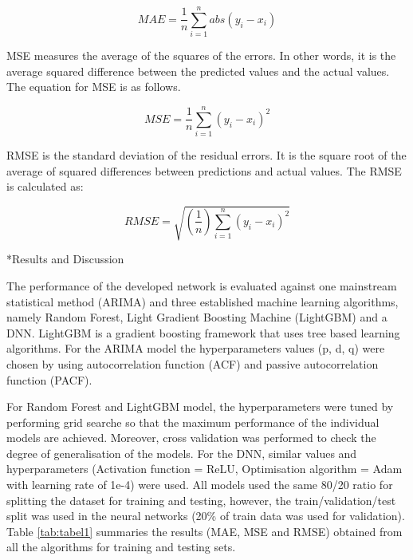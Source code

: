\documentclass[twocolumn, a4paper,10pt]{article}
\makeatletter
\renewcommand\section{\@startsection{section}{1}{\z@}{0.25cm}{0.1cm}{\normalfont\large\bfseries}}
\makeatother
\begin{document}
$$ MAE = \frac{1}{n}\sum_{i=1}^{n}abs(y_{i} - x_{i}) $$

MSE  measures the average of the squares of the errors. In other words, it is the average squared difference between the predicted values and the actual values. The equation for MSE is as follows.

$$ MSE = \frac{1}{n}\sum_{i=1}^{n}(y_{i} - x_{i})^{2} $$

RMSE is the standard deviation of the residual errors. It is the square root of the average of squared differences between predictions and actual values. The RMSE is calculated as:

$$ RMSE = \sqrt{(\frac{1}{n})\sum_{i=1}^{n}(y_{i} - x_{i})^{2}} $$


\section*{Results and Discussion}

The performance of the developed network is evaluated against one mainstream statistical method (ARIMA) and three established machine learning algorithms, namely Random Forest, Light Gradient Boosting Machine (LightGBM) \citep{RN1293} and a DNN. LightGBM is a gradient boosting framework that uses tree based learning algorithms. For the ARIMA model the hyperparameters values (p, d, q) were chosen by using autocorrelation function (ACF) and passive autocorrelation function (PACF).

For Random Forest and LightGBM model, the hyperparameters were tuned by performing grid searche so that the maximum performance of the individual models are achieved. Moreover, cross validation was performed to check the degree of generalisation of the models. For the DNN, similar values and hyperparameters (Activation function = ReLU, Optimisation algorithm = Adam with learning rate of 1e-4) were used. All models used the same 80/20 ratio for splitting the dataset for training and testing, however, the train/validation/test split was used in the neural networks (20\% of train data was used for validation). Table \ref{tab:tabel1} summaries the results (MAE, MSE and RMSE) obtained from all the algorithms for training and testing sets.
\end{document}
